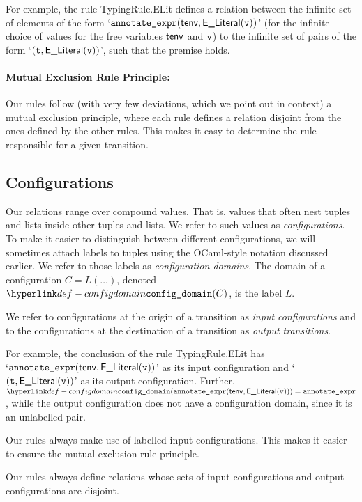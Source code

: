 For example, the rule TypingRule.ELit defines a relation between
the infinite set of elements of the form `$\texttt{annotate\_expr}(\textsf{tenv}, \textsf{E\_Literal}(\texttt{v}))$'
(for the infinite choice of values for the free variables $\textsf{tenv}$ and $\texttt{v}$) to the infinite
set of pairs of the form `$(\texttt{t}, \textsf{E\_Literal}(\texttt{v}))$', such that the premise holds.


\paragraph{Mutual Exclusion Rule Principle:}
Our rules follow (with very few deviations, which we point out in context) a mutual exclusion principle,
where each rule defines a relation disjoint from the ones defined by the other rules.
This makes it easy to determine the rule responsible for a given transition.

\hypertarget{def-configuration}{}
\subsection{Configurations}

\hypertarget{def-configdomain}{}
Our relations range over compound values. That is, values that often nest tuples and lists inside other tuples and lists.
We refer to such values as \emph{configurations}. To make it easier to distinguish between different configurations,
we will sometimes attach labels to tuples using the OCaml-style notation discussed earlier.
We refer to those labels as \emph{configuration domains}.
The domain of a configuration $C=L(\ldots)$, denoted $\configdomain{C}$, is the label $L$.

We refer to configurations at the origin of a transition as \emph{input configurations} and to the
configurations at the destination of a transition as \emph{output transitions}.

For example, the conclusion of the rule TypingRule.ELit has \\
`$\texttt{annotate\_expr}(\textsf{tenv}, \textsf{E\_Literal}(\texttt{v}))$' as its input configuration
and `$(\texttt{t}, \textsf{E\_Literal}(\texttt{v}))$' as its output configuration.
Further,
$\configdomain{\texttt{annotate\_expr}(\tenv, \ELiteral(\vv))} = \texttt{annotate\_expr}$,
while the output configuration does not have a configuration domain, since it is an unlabelled pair.

Our rules always make use of labelled input configurations. This makes it easier to ensure
the mutual exclusion rule principle.

Our rules always define relations whose sets of input configurations and output configurations are disjoint.

